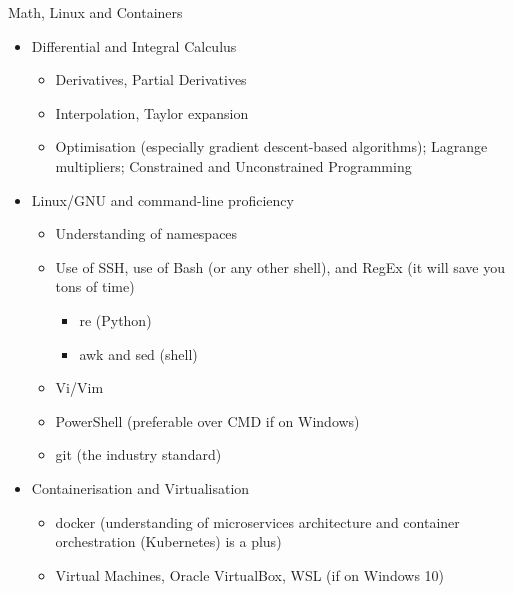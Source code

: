 \documentclass[compress,brown]{beamer}
\begin{document}
\begin{frame}{Math, Linux and Containers}
	\begin{itemize}
		\item Differential and Integral Calculus
		\begin{itemize}
			\item Derivatives, Partial Derivatives
			\item Interpolation, Taylor expansion
			\item Optimisation (especially gradient descent-based algorithms); Lagrange multipliers; Constrained and Unconstrained Programming
		\end{itemize}
		\item Linux/GNU and command-line proficiency
	\begin{itemize}
		\item Understanding of namespaces
		\item Use of SSH, use of Bash (or any other shell), and RegEx (it will save you tons of time)
			\begin{itemize}
				\item re (Python)
				\item awk and sed (shell)
			\end{itemize}
		\item Vi/Vim
		\item PowerShell (preferable over CMD if on Windows)
		\item git (the industry standard)
	\end{itemize}
		\item Containerisation and Virtualisation
	\begin{itemize}
		\item docker (understanding of microservices architecture and container orchestration (Kubernetes) is a plus)
		\item Virtual Machines, Oracle VirtualBox, WSL (if on Windows 10)
	\end{itemize}

\end{itemize}

\end{frame}
\end{document}
